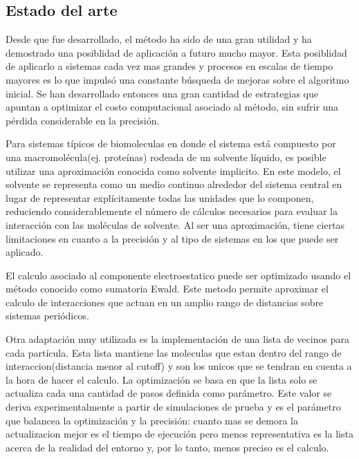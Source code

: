 \documentclass[a4paper,10pt]{report}
\begin{document}
\subsection{Estado del arte}



Desde que fue desarrollado, el método ha sido de una gran utilidad  y ha demostrado una posiblidad de aplicación a futuro mucho mayor. 
Esta posiblidad de aplicarlo a sistemas cada vez mas grandes y procesos en escalas de tiempo mayores es lo que impulsó una constante búsqueda de mejoras sobre el algoritmo inicial.
Se han desarrollado entonces una gran cantidad de estrategias que apuntan a optimizar el costo computacional asociado al método, sin sufrir una pérdida considerable en la precisión.

Para sistemas típicos de biomoleculas en donde el sistema está compuesto por una macromolécula(ej. proteínas) rodeada de un solvente líquido, es posible utilizar una aproximación conocida como solvente implicito.
En este modelo, el solvente se representa como un medio continuo alrededor del sistema central en lugar de representar explícitamente todas las unidades que lo componen, reduciendo considerablemente el número de cálculos necesarios para evaluar la interacción con las moléculas de solvente. Al ser una aproximación, tiene ciertas limitaciones en cuanto a la precisión y al tipo de sistemas en los que puede ser aplicado.

El calculo asociado al componente electroestatico puede ser optimizado usando el método conocido como sumatoria Ewald. Este metodo permite aproximar el calculo de interacciones que actuan en un amplio rango de distancias sobre sistemas periódicos. 

Otra adaptación muy utilizada es la implementación de una lista de vecinos para cada partícula. Esta lista mantiene las moleculas que estan dentro del rango de interaccion(distancia menor al cutoff) y son los unicos que se tendran en cuenta a la hora de hacer el calculo. La optimización se basa en que la lista solo se actualiza cada una cantidad de pasos definida como parámetro. 
Este valor se deriva experimentalmente a partir de simulaciones de prueba y es el parámetro que balancea la optimización y la precisión: cuanto mas se demora la actualizacion mejor es el tiempo de ejecución pero menos representativa es la lista acerca de la realidad del entorno y, por lo tanto, menos preciso es el calculo.
\end{document}
